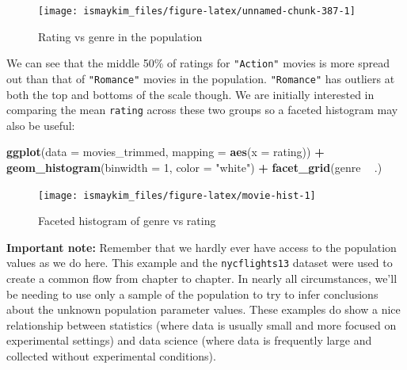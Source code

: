 \documentclass[12pt,]{krantz}
\makeatletter
\newenvironment{Shaded}{\begin{snugshade}}{\end{snugshade}}
\newcommand{\KeywordTok}[1]{\textcolor[rgb]{0.27,0.27,0.27}{\textbf{#1}}}
\newcommand{\DataTypeTok}[1]{\textcolor[rgb]{0.27,0.27,0.27}{#1}}
\newcommand{\DecValTok}[1]{\textcolor[rgb]{0.06,0.06,0.06}{#1}}
\newcommand{\StringTok}[1]{\textcolor[rgb]{0.5,0.5,0.5}{#1}}
\newcommand{\OperatorTok}[1]{\textcolor[rgb]{0.43,0.43,0.43}{\textbf{#1}}}
\newcommand{\NormalTok}[1]{#1}
\newenvironment{kframe}{%
\medskip{}
\setlength{\fboxsep}{.8em}
 \def\at@end@of@kframe{}%
 \ifinner\ifhmode%
  \def\at@end@of@kframe{\end{minipage}}%
  \begin{minipage}{\columnwidth}%
 \fi\fi%
 \def\FrameCommand##1{\hskip\@totalleftmargin \hskip-\fboxsep
 \colorbox{shadecolor}{##1}\hskip-\fboxsep
     \hskip-\linewidth \hskip-\@totalleftmargin \hskip\columnwidth}%
 \MakeFramed {\advance\hsize-\width
   \@totalleftmargin\z@ \linewidth\hsize
   \@setminipage}}%
 {\par\unskip\endMakeFramed%
 \at@end@of@kframe}
\renewenvironment{Shaded}{\begin{kframe}}{\end{kframe}}
\theoremstyle{definition}
\theoremstyle{definition}
\theoremstyle{definition}
\theoremstyle{remark}
\makeatother
\begin{document}
\begin{figure}

{\centering \texttt{[image: ismaykim\_files/figure-latex/unnamed-chunk-387-1]} 

}

\caption{Rating vs genre in the population}\label{fig:unnamed-chunk-387}
\end{figure}

We can see that the middle 50\% of ratings for \texttt{"Action"} movies
is more spread out than that of \texttt{"Romance"} movies in the
population. \texttt{"Romance"} has outliers at both the top and bottoms
of the scale though. We are initially interested in comparing the mean
\texttt{rating} across these two groups so a faceted histogram may also
be useful:

\begin{Shaded}
\begin{Highlighting}[]
\KeywordTok{ggplot}\NormalTok{(}\DataTypeTok{data =}\NormalTok{ movies_trimmed, }\DataTypeTok{mapping =} \KeywordTok{aes}\NormalTok{(}\DataTypeTok{x =}\NormalTok{ rating)) }\OperatorTok{+}
\StringTok{  }\KeywordTok{geom_histogram}\NormalTok{(}\DataTypeTok{binwidth =} \DecValTok{1}\NormalTok{, }\DataTypeTok{color =} \StringTok{"white"}\NormalTok{) }\OperatorTok{+}
\StringTok{  }\KeywordTok{facet_grid}\NormalTok{(genre }\OperatorTok{~}\StringTok{ }\NormalTok{.)}
\end{Highlighting}
\end{Shaded}

\begin{figure}

{\centering \texttt{[image: ismaykim\_files/figure-latex/movie-hist-1]} 

}

\caption{Faceted histogram of genre vs rating}\label{fig:movie-hist}
\end{figure}

\textbf{Important note:} Remember that we hardly ever have access to the
population values as we do here. This example and the
\texttt{nycflights13} dataset were used to create a common flow from
chapter to chapter. In nearly all circumstances, we'll be needing to use
only a sample of the population to try to infer conclusions about the
unknown population parameter values. These examples do show a nice
relationship between statistics (where data is usually small and more
focused on experimental settings) and data science (where data is
frequently large and collected without experimental conditions).
\end{document}
